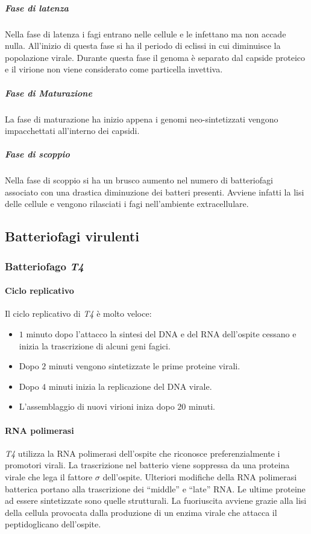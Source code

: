 				\subparagraph{Fase di latenza}
				Nella fase di latenza i fagi entrano nelle cellule e le infettano ma non accade nulla.
				All'inizio di questa fase si ha il periodo di eclissi in cui diminuisce la popolazione virale.
				Durante questa fase il genoma \`e separato dal capside proteico e il virione non viene considerato come particella invettiva.

				\subparagraph{Fase di Maturazione}
				La fase di maturazione ha inizio appena i genomi neo-sintetizzati vengono impacchettati all'interno dei capsidi.

				\subparagraph{Fase di scoppio}
				Nella fase di scoppio si ha un brusco aumento nel numero di batteriofagi associato con una drastica diminuzione dei batteri presenti.
				Avviene infatti la lisi delle cellule e vengono rilasciati i fagi nell'ambiente extracellulare.

	\subsection{Batteriofagi virulenti}

		\subsubsection{Batteriofago \emph{T4}}

			\paragraph{Ciclo replicativo}
			Il ciclo replicativo di \emph{T4} \`e molto veloce:
			\begin{multicols}{2}
				\begin{itemize}
    					\item $1$ minuto dopo l'attacco la sintesi del DNA e del RNA dell'ospite cessano e inizia la trascrizione di alcuni geni fagici.
    					\item Dopo $2$ minuti vengono sintetizzate le prime proteine virali.
    					\item Dopo $4$ minuti inizia la replicazione del DNA virale.
    					\item L'assemblaggio di nuovi virioni iniza dopo $20$ minuti. 
				\end{itemize}
			\end{multicols}

			\paragraph{RNA polimerasi}
			\emph{T4} utilizza la RNA polimerasi dell'ospite che riconosce preferenzialmente i promotori virali. 
			La trascrizione nel batterio viene soppressa da una proteina virale che lega il fattore $\sigma$ dell'ospite. 
			Ulteriori modifiche della RNA polimerasi batterica portano alla trascrizione dei ``middle'' e ``late'' RNA. 
			Le ultime proteine ad essere sintetizzate sono quelle strutturali. 
			La fuoriuscita avviene grazie alla lisi della cellula provocata dalla produzione di un enzima virale che attacca il peptidoglicano dell'ospite. 

